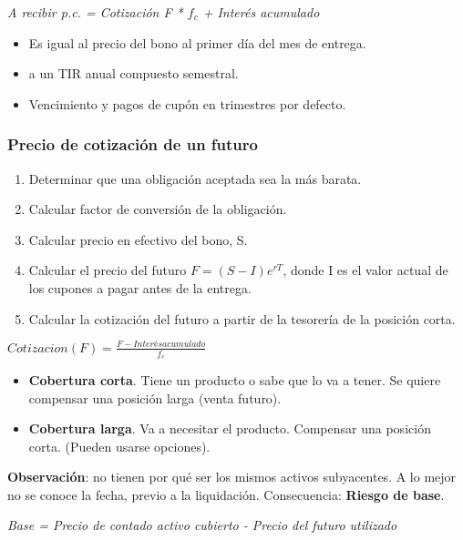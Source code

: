 \documentclass[
10pt, %
a4paper, %
oneside, %
headinclude,footinclude, %
BCOR5mm, %
]{scrartcl}
\newcommand{\n}[1]{\textbf{#1}}
\newcommand{\cur}[1]{\textit{#1}}
\newcommand{\sub}[1]{_{#1}}
\newcommand{\pot}[1]{^{#1}}
\newcommand{\f}[1]{{\large{${#1}$}}}
\newcounter{ex}
\begin{document}
			\cur{A recibir p.c. = Cotización F * \f{f\sub{c}} + Interés acumulado}


				\begin{itemize}
					\item Es igual al precio del bono al primer día del mes de entrega.
					\item a un TIR anual compuesto semestral.
					\item Vencimiento y pagos de cupón en trimestres por defecto.
				\end{itemize}

		\subsubsection{Precio de cotización de un futuro}
			\begin{enumerate}
				\item Determinar que una obligación aceptada sea la más barata.
				\item Calcular factor de conversión de la obligación.
				\item Calcular precio en efectivo del bono, S.
				\item Calcular el precio del futuro \f{F = (S-I)e\pot{rT}}, donde I es el valor actual de los cupones a pagar antes de la entrega.
				\item Calcular la cotización del futuro a partir de la tesorería de la posición corta.
			\end{enumerate}

			\begin{center} \f{Cotizacion(F) = \frac{F - Interés acumulado}{f\sub{c}}} \end{center}


			\begin{itemize}
				\item \n{Cobertura corta}. Tiene un producto o sabe que lo va a tener. Se quiere compensar una posición larga (venta futuro).
				\item \n{Cobertura larga}. Va a necesitar el producto. Compensar una posición corta. (Pueden usarse opciones).
			\end{itemize}

			\n{Observación}: no tienen por qué ser los mismos activos subyacentes. A lo mejor no se conoce la fecha, previo a la liquidación. Consecuencia: \n{Riesgo de base}.
			\begin{center} \cur{Base = Precio de contado activo cubierto - Precio del futuro utilizado} \end{center}
\end{document}
